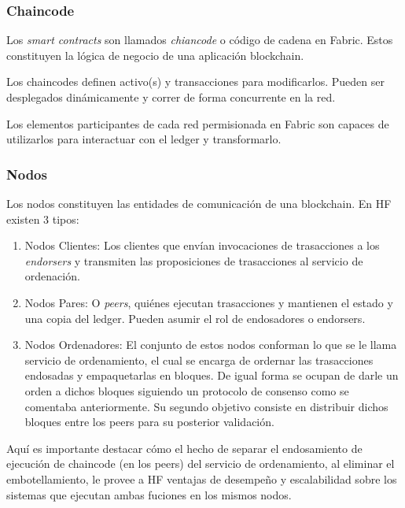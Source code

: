 \subsubsection{Chaincode}

Los \emph{smart contracts} son llamados \emph{chiancode} o c\'odigo de cadena en Fabric. Estos constituyen la l\'ogica de negocio de una aplicaci\'on blockchain. 

Los chaincodes definen activo(s) y transacciones para modificarlos. Pueden ser desplegados din\'amicamente y correr de forma concurrente en la red.

Los elementos participantes de cada red permisionada en Fabric son capaces de utilizarlos para interactuar con el ledger y transformarlo.

\subsubsection{Nodos}

Los nodos constituyen las entidades de comunicaci\'on de una blockchain. En HF existen 3 tipos:

\begin{enumerate}
	\item Nodos Clientes: Los clientes que env\'ian invocaciones de trasacciones a los \emph{endorsers} y transmiten las proposiciones de trasacciones al servicio de ordenaci\'on.
	
	
	\item Nodos Pares: O \emph{peers}, qui\'enes ejecutan trasacciones y mantienen el estado y una copia del ledger. Pueden asumir el rol de endosadores o endorsers.
	
	\item Nodos Ordenadores: El conjunto de estos nodos conforman lo que se le llama servicio de ordenamiento, el cual se encarga de ordernar las trasacciones endosadas y empaquetarlas en bloques. De igual forma se ocupan de darle un orden a dichos bloques siguiendo un protocolo de consenso como se comentaba anteriormente. Su segundo objetivo consiste en distribuir dichos bloques entre los peers para su posterior validaci\'on.
	
\end{enumerate}

Aqu\'i es importante destacar c\'omo el hecho de separar el endosamiento de ejecuci\'on de chaincode (en los peers) del servicio de ordenamiento, al eliminar el embotellamiento, le provee a HF ventajas de desempe\~no y escalabilidad sobre los sistemas que ejecutan ambas fuciones en los mismos nodos.

